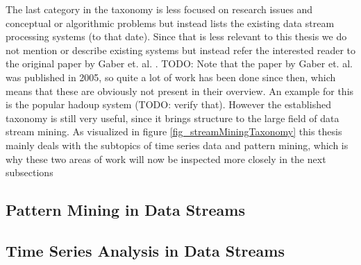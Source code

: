 The last category in the taxonomy is less focused on research issues and conceptual or algorithmic problems but instead lists the existing data stream processing systems (to that date). Since that is less relevant to this thesis we do not mention or describe existing systems but instead refer the interested reader to the original paper by Gaber et. al. \cite{gaber2005mining}. \newline
TODO: Note that the paper by Gaber et. al. was published in 2005, so quite a lot of work has been done since then, which means that these are obviously not present in their overview. An example for this is the popular hadoup system (TODO: verify that). However the established taxonomy is still very useful, since it brings structure to the large field of data stream mining. \newline
As visualized in figure \ref{fig_streamMiningTaxonomy} this thesis mainly deals with the subtopics of time series data and pattern mining, which is why these two areas of work will now be inspected more closely in the next subsections

\subsection{Pattern Mining in Data Streams}


\subsection{Time Series Analysis in Data Streams}


